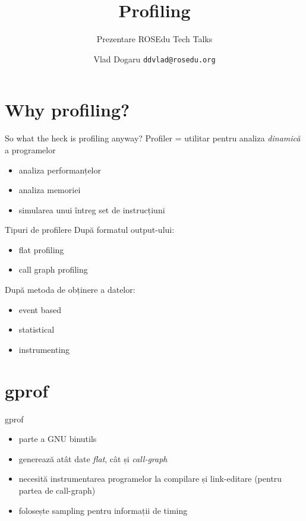 \documentclass{beamer}
\title{Profiling}
\subtitle{Prezentare ROSEdu Tech Talks}
\institute{ROSEdu}
\author{Vlad Dogaru \texttt{ddvlad@rosedu.org}}
\begin{document}
\frame{\titlepage}

\section{Why profiling?}

\frame{\tableofcontents[currentsection]}

\begin{frame}{So what the heck is profiling anyway?}
  Profiler = utilitar pentru analiza \textit{dinamică} a programelor
  \begin{itemize}
    \item analiza performanțelor
    \item analiza memoriei
    \item simularea unui întreg set de instrucțiuni
  \end{itemize}
\end{frame}

\begin{frame}{Tipuri de profilere}
  După formatul output-ului:
  \begin{itemize}
    \item flat profiling
    \item call graph profiling
  \end{itemize}
  \pause
  După metoda de obținere a datelor:
  \begin{itemize}
    \item event based
    \item statistical
    \item instrumenting
  \end{itemize}
\end{frame}

\section{gprof}
\frame{\tableofcontents[currentsection]}

\begin{frame}{gprof}
  \begin{itemize}
    \item parte a GNU binutils
    \item generează atât date \textit{flat}, cât și \textit{call-graph}
    \item necesită instrumentarea programelor la compilare și link-editare
    (pentru partea de call-graph)
    \item folosește sampling pentru informații de timing
  \end{itemize}
\end{frame}
\end{document}
